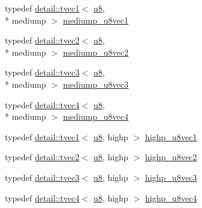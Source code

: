 \begin{DoxyCompactItemize}
\item 
typedef \hyperlink{structglm_1_1detail_1_1tvec1}{detail\-::tvec1}$<$ \hyperlink{group__gtc__type__precision_ga5e3dc67373d5068997d2d9f41c9024d2}{u8}, \\*
mediump $>$ \hyperlink{group__gtc__type__precision_gadefca284b7a5980fb6be735abb77395e}{mediump\-\_\-u8vec1}
\item 
typedef \hyperlink{structglm_1_1detail_1_1tvec2}{detail\-::tvec2}$<$ \hyperlink{group__gtc__type__precision_ga5e3dc67373d5068997d2d9f41c9024d2}{u8}, \\*
mediump $>$ \hyperlink{group__gtc__type__precision_ga5e20c1315bc1fecc867bc74525bea2ab}{mediump\-\_\-u8vec2}
\item 
typedef \hyperlink{structglm_1_1detail_1_1tvec3}{detail\-::tvec3}$<$ \hyperlink{group__gtc__type__precision_ga5e3dc67373d5068997d2d9f41c9024d2}{u8}, \\*
mediump $>$ \hyperlink{group__gtc__type__precision_ga58f79eee840b2838443292c50ddb2919}{mediump\-\_\-u8vec3}
\item 
typedef \hyperlink{structglm_1_1detail_1_1tvec4}{detail\-::tvec4}$<$ \hyperlink{group__gtc__type__precision_ga5e3dc67373d5068997d2d9f41c9024d2}{u8}, \\*
mediump $>$ \hyperlink{group__gtc__type__precision_ga407b5aa9a3fd6d344b70fa6ce2ce92d4}{mediump\-\_\-u8vec4}
\item 
typedef \hyperlink{structglm_1_1detail_1_1tvec1}{detail\-::tvec1}$<$ \hyperlink{group__gtc__type__precision_ga5e3dc67373d5068997d2d9f41c9024d2}{u8}, highp $>$ \hyperlink{group__gtc__type__precision_ga8e7e9156357a2b748fe39702c3bdbeec}{highp\-\_\-u8vec1}
\item 
typedef \hyperlink{structglm_1_1detail_1_1tvec2}{detail\-::tvec2}$<$ \hyperlink{group__gtc__type__precision_ga5e3dc67373d5068997d2d9f41c9024d2}{u8}, highp $>$ \hyperlink{group__gtc__type__precision_ga9aed4b3bacd37a43ec369bcf76be144a}{highp\-\_\-u8vec2}
\item 
typedef \hyperlink{structglm_1_1detail_1_1tvec3}{detail\-::tvec3}$<$ \hyperlink{group__gtc__type__precision_ga5e3dc67373d5068997d2d9f41c9024d2}{u8}, highp $>$ \hyperlink{group__gtc__type__precision_ga52bdf53a4f05023c13a9b817526d249f}{highp\-\_\-u8vec3}
\item 
typedef \hyperlink{structglm_1_1detail_1_1tvec4}{detail\-::tvec4}$<$ \hyperlink{group__gtc__type__precision_ga5e3dc67373d5068997d2d9f41c9024d2}{u8}, highp $>$ \hyperlink{group__gtc__type__precision_ga3a46f19674a65471988b41ffdaa834c5}{highp\-\_\-u8vec4}
\item 

\end{DoxyCompactItemize}

